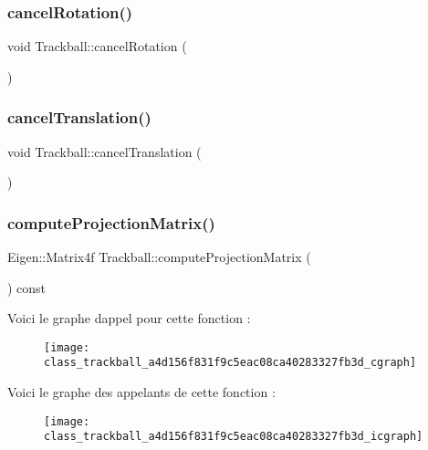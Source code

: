 \subsubsection{\texorpdfstring{cancel\+Rotation()}{cancelRotation()}}
{\footnotesize\ttfamily void Trackball\+::cancel\+Rotation (\begin{DoxyParamCaption}{ }\end{DoxyParamCaption})}

\mbox{\label{class_trackball_a0666f601bf5171b96051074a59a3df73}} 
\subsubsection{\texorpdfstring{cancel\+Translation()}{cancelTranslation()}}
{\footnotesize\ttfamily void Trackball\+::cancel\+Translation (\begin{DoxyParamCaption}{ }\end{DoxyParamCaption})}

\mbox{\label{class_trackball_a4d156f831f9c5eac08ca40283327fb3d}} 
\subsubsection{\texorpdfstring{compute\+Projection\+Matrix()}{computeProjectionMatrix()}}
{\footnotesize\ttfamily Eigen\+::\+Matrix4f Trackball\+::compute\+Projection\+Matrix (\begin{DoxyParamCaption}{ }\end{DoxyParamCaption}) const}

Voici le graphe d\textquotesingle{}appel pour cette fonction \+:\nopagebreak
\begin{figure}[H]
\begin{center}
\leavevmode
\texttt{[image: class\_trackball\_a4d156f831f9c5eac08ca40283327fb3d\_cgraph]}
\end{center}
\end{figure}
Voici le graphe des appelants de cette fonction \+:\nopagebreak
\begin{figure}[H]
\begin{center}
\leavevmode
\texttt{[image: class\_trackball\_a4d156f831f9c5eac08ca40283327fb3d\_icgraph]}
\end{center}
\end{figure}
\mbox{\label{class_trackball_acb8ad68c2077f4ff149e501acfe67d50}} 
